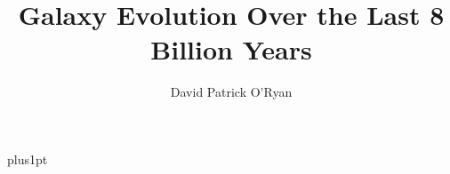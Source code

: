 \documentclass[12pt]{Latex/PhDthesisPSnPDF}
\title{Galaxy Evolution Over the Last 8 Billion Years}
\author{David Patrick O'Ryan}
\begin{document}
\newcommand{\nn}{\nonumber}
\newcommand{\bg}{\begin{equation}}
\newcommand{\en}{\end{equation}}
\renewcommand\[{\begin{equation}}
\renewcommand\]{\end{equation}}
\newcommand{\al}{\alpha}
\newcommand{\bt}{\beta}
\newcommand{\ga}{\gamma}
\newcommand{\da}{\delta}
\newcommand{\n}{\nabla}
\newcommand{\ba}{\begin{eqnarray}}
\newcommand{\ea}{\end{eqnarray}}
\newcommand{\LF}{\left(}
\newcommand{\RF}{\right)}
\newcommand{\LT}{\left[}
\newcommand{\RT}{\right]}
\newcommand{\Ld}{\left.}
\newcommand{\Rd}{\right.}
\newcommand{\cO}{{\cal O}}
\newcommand{\cF}{{\cal F}}
\newcommand{\Ra}{\Rightarrow}
\newcommand{\bl}{\begin{align}}
\newcommand{\el}{\end{align}}
\newcommand{\fl}{}
\newcommand{\apj}{ApJ}
\newcommand{\aap}{A\&A}
\newcommand{\aaps}{A\&AS}
\newcommand{\mnras}{MNRAS}
\newcommand{\nat}{Nature}
\newcommand{\pasj}{PASJ}
\newcommand{\aj}{AJ}
\newcommand{\apjs}{ApJS}
\newcommand{\apjl}{ApJL}
\newcommand{\pasp}{PASP}
\newtheorem{theorem}{Theorem}[section]
\theoremstyle{definition}
\newtheorem{definition}{Definition}[section]

\renewcommand\baselinestretch{1.5}
\baselineskip=18pt plus1pt



\maketitle  %






\end{document}
